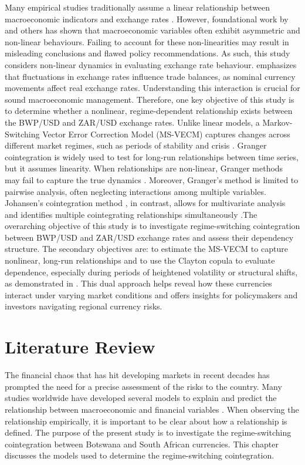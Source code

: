 \documentclass[a4paper]{article}
\theoremstyle{plain}
\theoremstyle{definition}
\theoremstyle{remark}
\begin{document}
\newline
Many empirical studies traditionally assume a linear relationship between macroeconomic indicators and exchange rates \citep{makatjane2017}. However, foundational work by \cite{granger1989} and others has shown that macroeconomic variables often exhibit asymmetric and non-linear behaviours. Failing to account for these non-linearities may result in misleading conclusions and flawed policy recommendations. As such, this study considers non-linear dynamics in evaluating exchange rate behaviour. \cite{arize2017exchange} emphasizes that fluctuations in exchange rates influence trade balances, as nominal currency movements affect real exchange rates. Understanding this interaction is crucial for sound macroeconomic management. Therefore, one key objective of this study is to determine whether a nonlinear, regime-dependent relationship exists between the BWP/USD and ZAR/USD exchange rates. Unlike linear models, a Markov-Switching Vector Error Correction Model (MS-VECM) captures changes across different market regimes, such as periods of stability and crisis \citep{makatjane2021predicting}.
\newline
Granger cointegration is widely used to test for long-run relationships between time series, but it assumes linearity. When relationships are non-linear, Granger methods may fail to capture the true dynamics \citep{castle2017clive}. Moreover, Granger’s method is limited to pairwise analysis, often neglecting interactions among multiple variables. Johansen's cointegration method \citep{johansen1988statistical}, in contrast, allows for multivariate analysis and identifies multiple cointegrating relationships simultaneously \citep{sekakela2019impact, yussuf2022cointegration}.The overarching objective of this study is to investigate regime-switching cointegration between BWP/USD and ZAR/USD exchange rates and assess their dependency structure. The secondary objectives are: to estimate the MS-VECM to capture nonlinear, long-run relationships and to use the Clayton copula to evaluate dependence, especially during periods of heightened volatility or structural shifts, as demonstrated in \cite{LIU2020106808}. This dual approach helps reveal how these currencies interact under varying market conditions and offers insights for policymakers and investors navigating regional currency risks.
\section{Literature Review}
The financial chaos that has hit developing markets in recent decades has prompted the need for a precise assessment of the risks to the country. Many studies worldwide have developed several models to explain and predict the relationship between macroeconomic and financial variables \citep{staehr2021macroeconomic}. When observing the relationship empirically, it is important to be clear about how a relationship is defined. The purpose of the present study is to investigate the regime-switching cointegration between Botswana and South African currencies. This chapter discusses the models used to determine the regime-switching cointegration. 
\end{document}
